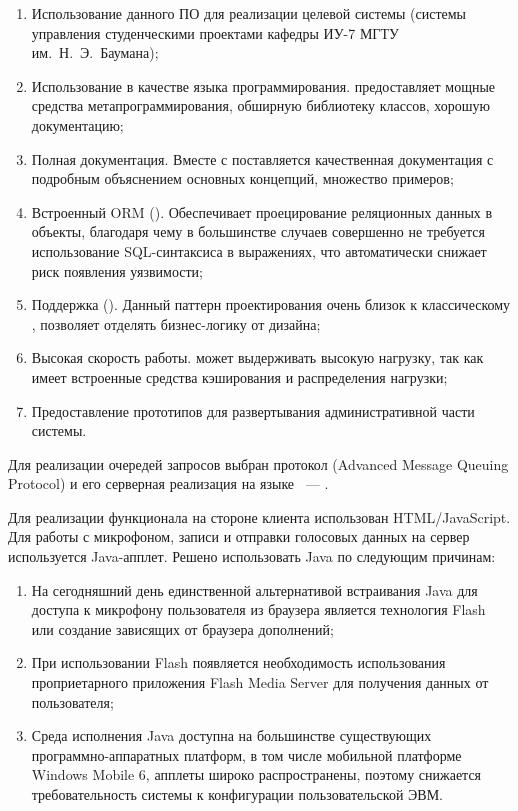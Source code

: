\begin{enumerate}
\item Использование данного ПО для реализации целевой системы (системы
управления студенческими проектами кафедры ИУ-7 МГТУ им.~Н.~Э.~Баумана);
\item Использование  в качестве языка программирования.  предоставляет мощные средства метапрограммирования, обширную библиотеку классов, хорошую документацию;
\item Полная документация. Вместе с  поставляется качественная документация с подробным объяснением основных концепций, множество примеров;
\item Встроенный ORM (). Обеспечивает проецирование реляционных данных в объекты, благодаря чему в большинстве случаев совершенно не требуется использование SQL-синтаксиса в выражениях, что автоматически снижает риск появления  уязвимости;
\item Поддержка  (). Данный паттерн проектирования очень близок к классическому , позволяет отделять бизнес-логику от дизайна;
\item Высокая скорость работы.  может выдерживать высокую нагрузку, так как имеет встроенные средства кэширования и распределения нагрузки;
\item Предоставление прототипов для развертывания административной части системы.
\end{enumerate}

Для реализации очередей запросов выбран протокол  (Advanced Message
Queuing Protocol) и его серверная реализация на языке ~---
.

Для реализации функционала на стороне клиента использован HTML/JavaScript. Для
работы с микрофоном, записи и отправки голосовых данных на
сервер используется Java-апплет. Решено использовать Java по следующим причинам:

\begin{enumerate}
\item На сегодняшний день единственной альтернативой встраивания Java для
доступа к микрофону пользователя из браузера является технология Flash или
создание зависящих от браузера дополнений;
\item При использовании Flash появляется необходимость использования
проприетарного приложения Flash Media Server для получения данных от
пользователя;
\item Среда исполнения Java доступна на большинстве существующих
программно-аппаратных платформ, в том числе мобильной платформе Windows Mobile
6, апплеты широко распространены, поэтому снижается требовательность системы к
конфигурации пользовательской ЭВМ.
\end{enumerate}

